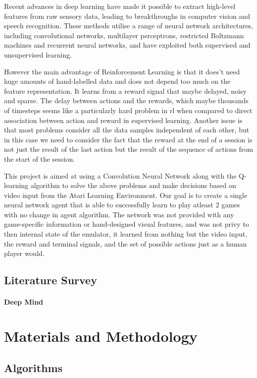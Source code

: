 \documentclass[a4paper,11pt]{article}
\begin{document}
			Recent advances in deep learning have made it possible to extract high-level features from raw sensory data, leading to breakthroughs in computer vision and speech recognition. These methods utilise a range of neural network architectures, including convolutional networks, multilayer perceptrons, restricted Boltzmann machines and recurrent neural networks, and have exploited both supervised and unsupervised learning.
	
			However the main advantage of Reinforcement Learning is that it does't need huge amounts of hand-labelled data and does not depend too much on the feature representation. It learns from a reward signal that maybe delayed, noisy and sparse. The delay between actions and the rewards, which maybe thousands of timesteps seems like a particularly hard problem in \ac{rl} when compared to direct association between action and reward in supervised learning. Another issue is that most problems consider all the data samples independent of each other, but in this case we need to consider the fact that the reward at the end of a session is not just the result of the last action but the result of the sequence of actions from the start of the session.

			This project is aimed at using a Convolution Neural Network along with the Q-learning algorithm to solve the above problems and make decisions based on video input from the Atari Learning Environment. Our goal is to create a single neural network agent that is able to successfully learn to play atleast 2 games with no change in agent algorithm. The network was not provided with any game-specific information or hand-designed visual features, and was not privy to then internal state of the emulator, it learned from nothing but the video input, the reward and terminal signals, and the set of possible actions just as a human player would.

		\subsection{Literature Survey}
			\paragraph{Deep Mind}

	\section{Materials and Methodology}
		\subsection{Algorithms}
\end{document}
